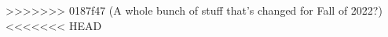 \documentclass{../../oss-apphys-exam}
\begin{document}
\begin{multicols*}{2}
\begin{questions}
\begin{questions}
{>>>>>>> 0187f47 (A whole bunch of stuff that's changed for Fall of 2022?)
<<<<<<< HEAD
    
}
\end{questions}
\end{questions}
\end{multicols*}
\end{document}

